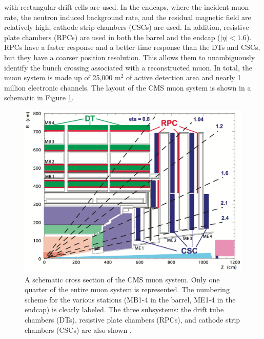 with rectangular drift cells are used.
In the endcaps, where the incident muon rate, the neutron induced background rate,
and the residual magnetic field are relatively high, cathode strip chambers (CSCs)
are used.
In addition, resistive plate chambers (RPCs)
are used in both the barrel and the endcap ($|\eta| < 1.6$).  RPCs have a faster response and a 
better time response than the DTs and CSCs, but they have a coarser position resolution.
This allows them to unambiguously identify the bunch crossing associated with a reconstructed muon.
In total, the muon system is made up of 25,000 $\text{m}^2$ of active detection area and nearly
1 million electronic channels.
The layout of the CMS muon system is shown in a schematic in Figure \ref{fig:muon}.

\begin{figure}
  \centering
  \includegraphics[width=1.0\textwidth]{tex/cms/fig/muon-schematic.png}
  \caption{A schematic cross section of the CMS muon system.  Only one quarter of the entire
    muon system is represented. The numbering scheme for the various stations (MB1-4 in the barrel,
    ME1-4 in the endcap) is clearly labeled.
    The three subsystems: the drift tube chambers (DTs), 
    resistive plate chambers (RPCs), and cathode strip chambers (CSCs) are also shown
    \cite{cms-tdr}.}
  \label{fig:muon}
\end{figure}

